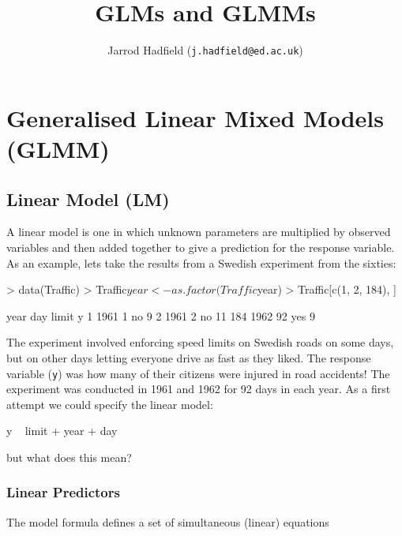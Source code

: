 \documentclass{article}
\title{GLMs and GLMMs}
\author{Jarrod Hadfield (\texttt{j.hadfield@ed.ac.uk})}
\begin{document}
\maketitle
\else
\chapter[GLMM]{Generalised Linear Mixed Models (GLMM)}
\label{chap2}
\fi



\section{Linear Model (LM)}

A linear model is one in which unknown parameters are multiplied by observed variables and then added together to give a prediction for the response variable. As an example, lets take the results from a Swedish experiment from the sixties:

\begin{Schunk}
\begin{Sinput}
> data(Traffic)
> Traffic$year <- as.factor(Traffic$year)
> Traffic[c(1, 2, 184), ]
\end{Sinput}
\begin{Soutput}
    year day limit  y
1   1961   1    no  9
2   1961   2    no 11
184 1962  92   yes  9
\end{Soutput}
\end{Schunk}

The experiment involved enforcing speed limits on Swedish roads on some days, but on other days letting everyone drive as fast as they liked.  The response variable (\texttt{y}) was how many of their citizens were injured in road accidents! The experiment was conducted in 1961 and 1962 for 92 days in each year. As a first attempt we could specify the linear model:

\begin{Schunk}
\begin{Soutput}
y ~ limit + year + day
\end{Soutput}
\end{Schunk}

but what does this mean?\\

\subsection{Linear Predictors}

The model formula defines a set of simultaneous (linear) equations 
\end{document}
